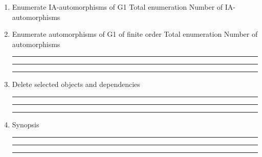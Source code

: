 \begin{enumerate}
\bigskip
\item Enumerate IA-automorphisms of G1
\subitem Total enumeration
\subsubitem Number of IA-automorphisms

\bigskip
\item Enumerate automorphisms of G1 of finite order
\subitem Total enumeration \subsubitem Number of automorphisms
\bigskip
\hrule\hrule\hrule

\item Delete selected objects and dependencies

\bigskip
\hrule\hrule\hrule

\item
Synopsis

\bigskip
\hrule\hrule\hrule

\end{enumerate}
